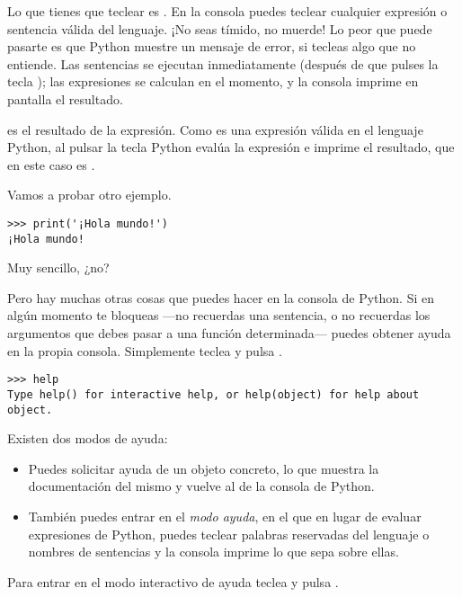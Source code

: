 Lo que tienes que teclear es .  En la consola puedes teclear cualquier expresión o sentencia válida del lenguaje. ¡No seas tímido, no muerde! Lo peor que puede pasarte es que Python muestre un mensaje de error, si tecleas algo que no entiende. Las sentencias se ejecutan inmediatamente (después de que pulses la tecla ); las expresiones se calculan en el momento, y la consola imprime en pantalla el resultado.

 es el resultado de la expresión. Como  es una expresión válida en el lenguaje Python, al pulsar la tecla  Python evalúa la expresión e imprime el resultado, que en este caso es .

Vamos a probar otro ejemplo.

\begin{listing}
\begin{verbatim}
>>> print('¡Hola mundo!')
¡Hola mundo!
\end{verbatim}
\end{listing}

Muy sencillo, ¿no?

Pero hay muchas otras cosas que puedes hacer en la consola de Python. Si en algún momento te bloqueas ---no recuerdas una sentencia, o no recuerdas los argumentos que debes pasar a una función determinada--- puedes obtener ayuda en la propia consola. Simplemente teclea  y pulsa .

\begin{listing}
\begin{verbatim}
>>> help
Type help() for interactive help, or help(object) for help about object.
\end{verbatim}
\end{listing}

Existen dos modos de ayuda:
\begin{itemize}
\item Puedes solicitar ayuda de un objeto concreto, lo que muestra la documentación del mismo y vuelve al  de la consola de Python. 
\item También puedes entrar en el \emph{modo ayuda}, en el que en lugar de evaluar expresiones de Python, puedes teclear palabras reservadas del lenguaje o nombres de sentencias y la consola imprime lo que sepa sobre ellas.
\end{itemize}

Para entrar en el modo interactivo de ayuda teclea  y pulsa .

